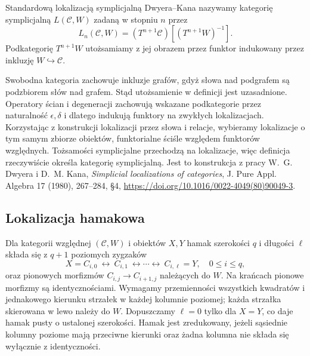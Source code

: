 \begin{definicja}\label{cat:def:dk-standard-localization}
Standardową lokalizacją symplicjalną Dwyera--Kana nazywamy kategorię symplicjalną $L(\mathcal C,W)$ zadaną w stopniu $n$ przez
\[
 L_n(\mathcal C,W)=
 (T^{n+1}\mathcal C)[(T^{n+1}W)^{-1}].
\]
Podkategorię $T^{n+1}W$ utożsamiamy z jej obrazem przez funktor indukowany przez inkluzję $W\hookrightarrow\mathcal C$.
\end{definicja}

Swobodna kategoria zachowuje inkluzje grafów, gdyż słowa nad podgrafem są podzbiorem słów nad grafem. Stąd utożsamienie w definicji jest uzasadnione. Operatory ścian i degeneracji zachowują wskazane podkategorie przez naturalność $\epsilon,\delta$ i dlatego indukują funktory na zwykłych lokalizacjach. Korzystając z konstrukcji lokalizacji przez słowa i relacje, wybieramy lokalizacje o tym samym zbiorze obiektów, funktorialne ściśle względem funktorów względnych. Tożsamości symplicjalne przechodzą na lokalizacje, więc definicja rzeczywiście określa kategorię symplicjalną. Jest to konstrukcja z pracy W.~G. Dwyera i D.~M. Kana, \emph{Simplicial localizations of categories}, J. Pure Appl. Algebra 17 (1980), 267--284, \S4, \url{https://doi.org/10.1016/0022-4049(80)90049-3}.

\subsection{Lokalizacja hamakowa}

\begin{definicja}[Hamak]\label{cat:def:dk-hammock}
Dla kategorii względnej $(\mathcal C,W)$ i obiektów $X,Y$ hamak szerokości $q$ i długości $\ell$ składa się z $q+1$ poziomych zygzaków
\[
 X=C_{i,0}\ \longleftrightarrow\ C_{i,1}\
 \longleftrightarrow\cdots\longleftrightarrow\ C_{i,\ell}=Y,
 \quad 0\leq i\leq q,
\]
oraz pionowych morfizmów $C_{i,j}\to C_{i+1,j}$ należących do $W$. Na krańcach pionowe morfizmy są identycznościami. Wymagamy przemienności wszystkich kwadratów i jednakowego kierunku strzałek w każdej kolumnie poziomej; każda strzałka skierowana w lewo należy do $W$. Dopuszczamy $\ell=0$ tylko dla $X=Y$, co daje hamak pusty o ustalonej szerokości. Hamak jest zredukowany, jeżeli sąsiednie kolumny poziome mają przeciwne kierunki oraz żadna kolumna nie składa się wyłącznie z identyczności.
\end{definicja}

